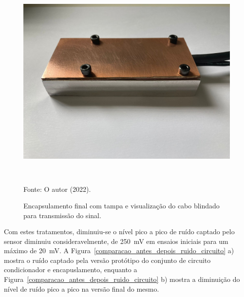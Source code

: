 \documentclass[
	12pt,				
	oneside,			
	a4paper,			
	english,			
	brazil,	
	sumario=abnt-6027-2012		
	]{abntex2ppgsi}
\begin{document}
\begin{figure}[H]
\centering
\caption {Encapsulamento final com tampa e visualização do cabo blindado para transmissão do sinal.}
\includegraphics[width=\textwidth,height=110mm,keepaspectratio]{encapsulamento_novo_externo} \\
Fonte: O autor (2022).
\label{encapsulamento_novo_externo}
\end{figure} 

Com estes tratamentos, diminuiu-se o nível pico a pico de ruído captado pelo sensor diminuiu consideravelmente, de {\SI{250}{\milli\volt}} em ensaios iniciais para um máximo de {\SI{20}{\milli\volt}}. A Figura~\ref{comparacao_antes_depois_ruido_circuito} a) mostra o ruído captado pela versão protótipo do conjunto de circuito condicionador e encapuslamento, enquanto a Figura~\ref{comparacao_antes_depois_ruido_circuito} b) mostra a diminuição do nível de ruído pico a pico na versão final do mesmo.
\end{document}

